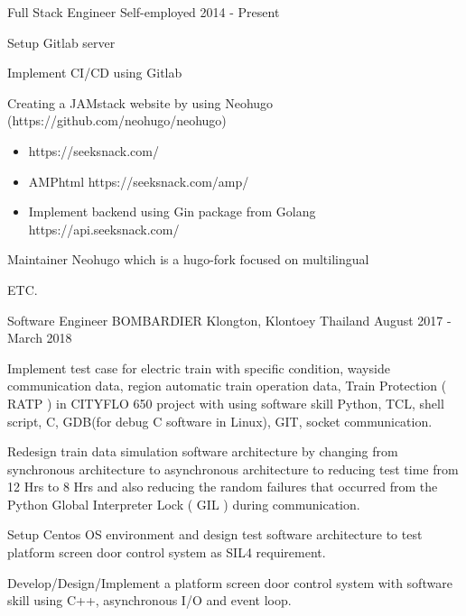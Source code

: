 \begin{cventries}
  \cventry
    {Full Stack Engineer} %
    {Self-employed} %
    {} %
    {2014 - Present} %
    {
      \begin{cvitems} %
        \item {Setup Gitlab server}
        \item {Implement CI/CD using Gitlab}
        \item {Creating a JAMstack website by using Neohugo
              (https://github.com/neohugo/neohugo) }
         \begin{itemize}
           \item https://seeksnack.com/
           \item AMPhtml https://seeksnack.com/amp/
           \item Implement backend using Gin package from Golang
             https://api.seeksnack.com/
         \end{itemize}
        \item {Maintainer Neohugo which is a hugo-fork focused on multilingual}
        \item {ETC.}
      \end{cvitems}
    }

  \cventry
    {Software Engineer} %
    {BOMBARDIER} %
    {Klongton, Klontoey Thailand} %
    {August 2017 - March 2018} %
    {
      \begin{cvitems} %
       \item {Implement test case for electric train with specific condition, wayside communication
          data, region automatic train operation data, Train Protection ( RATP ) in CITYFLO 650 project
          with using software skill Python, TCL, shell script, C, GDB(for debug C software in Linux), GIT, socket communication.}
       \item {Redesign train data simulation software architecture by changing
          from synchronous architecture to asynchronous architecture to reducing test
          time from 12 Hrs to 8 Hrs and also reducing the random failures that
          occurred from the Python Global Interpreter Lock ( GIL ) during
          communication.}
       \item {Setup Centos OS environment and design test software architecture
       to test platform screen door control system as SIL4 requirement.}
       \item {Develop/Design/Implement a platform screen door control system with
       software skill using C++, asynchronous I/O and event loop.}
      \end{cvitems}
    }


\end{cventries}
